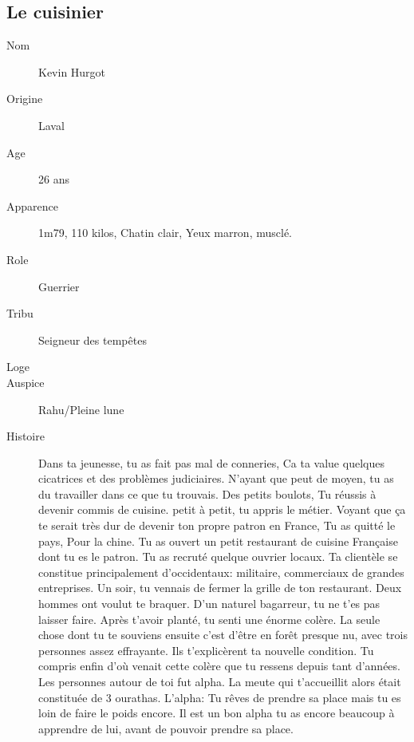\documentclass[oneside,12pt]{book}
\begin{document}
\begin{flushleft}
\subsection{Le cuisinier}
\begin{description}
\item[Nom]{ Kevin Hurgot}
\item[Origine]{ Laval}
\item[Age]{  26 ans}
\item[Apparence]{1m79, 110 kilos, Chatin clair, Yeux marron, musclé.}
\item[Role]{Guerrier}
\item[Tribu]{Seigneur des tempêtes}
\item[Loge]{}
\item[Auspice]{Rahu/Pleine lune}
\item[Histoire]{Dans ta jeunesse, tu as fait pas mal de conneries, Ca ta value quelques cicatrices et des problèmes judiciaires. N'ayant que peut de moyen, tu as du travailler dans ce que tu trouvais. Des petits boulots,
Tu réussis à devenir commis de cuisine. petit à petit, tu appris le métier. Voyant que ça te serait très dur de devenir ton propre patron en France, Tu as quitté le pays, Pour la chine. Tu as ouvert un petit restaurant de cuisine Française dont tu es le patron. Tu as recruté quelque ouvrier locaux. Ta clientèle se constitue principalement d'occidentaux: militaire, commerciaux de grandes entreprises.  Un soir, tu vennais de fermer la grille de ton restaurant. Deux hommes ont voulut te braquer. D'un naturel bagarreur, tu ne t'es pas laisser faire. Après t'avoir planté, tu senti une énorme colère. La seule chose dont tu te souviens ensuite c'est d'être en forêt presque nu, avec trois personnes assez effrayante. Ils t'explicèrent ta nouvelle condition. Tu compris enfin d'où venait cette colère que tu ressens depuis tant d'années. Les personnes autour de toi fut alpha. La meute qui t'accueillit alors était constituée de 3 ourathas. L'alpha: Tu rêves de prendre sa place mais tu es loin de faire le poids encore. Il est un bon alpha tu as encore beaucoup à apprendre de lui, avant de pouvoir prendre sa place. }
\end{description}
\clearpage


\end{flushleft}
\end{document}
